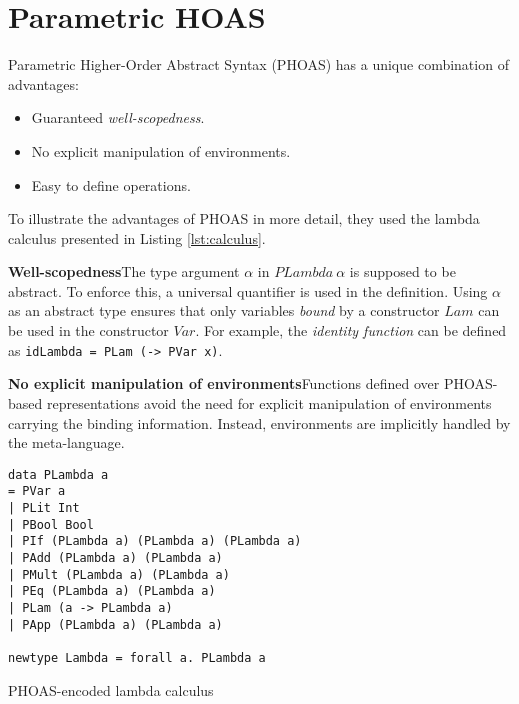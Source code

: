 \section{Parametric HOAS}\label{sec:phoas}

Parametric Higher-Order Abstract Syntax (PHOAS) has a unique combination of advantages:

\begin{itemize}
  \item Guaranteed \emph{well-scopedness}.
  \item No explicit manipulation of environments.
  \item Easy to define operations.
\end{itemize}

To illustrate the advantages of PHOAS in more detail, they used the lambda calculus presented in Listing \ref{lst:calculus}.

\textbf{Well-scopedness}\quad The type argument $\alpha$ in $PLambda \ \alpha$ is supposed to be abstract. To enforce this, a universal quantifier is used in the definition. Using $\alpha$ as an abstract type ensures that only variables \emph{bound} by a constructor $Lam$ can be used in the constructor $Var$. For example, the \emph{identity function} can be defined as \texttt{idLambda = PLam (\x -> PVar x)}.

\textbf{No explicit manipulation of environments}\quad Functions defined over PHOAS-based representations avoid the need for explicit manipulation of environments carrying the binding information. Instead, environments are implicitly handled by the meta-language. %

\begin{listing}[H]
\begin{verbatim}
data PLambda a
= PVar a
| PLit Int
| PBool Bool
| PIf (PLambda a) (PLambda a) (PLambda a)
| PAdd (PLambda a) (PLambda a)
| PMult (PLambda a) (PLambda a)
| PEq (PLambda a) (PLambda a)
| PLam (a -> PLambda a)
| PApp (PLambda a) (PLambda a)

newtype Lambda = forall a. PLambda a
\end{verbatim}
\caption{PHOAS-encoded lambda calculus}
\label{lst:calculus}
\end{listing}


